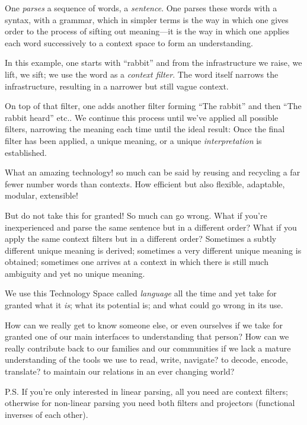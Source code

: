 \documentclass[twoside]{article}
\begin{document}
One \emph{parses} a sequence of words, a \emph{sentence}. One parses these words with a syntax, with a grammar,
which in simpler terms is the way in which one gives order to the process of sifting out meaning---it is the
way in which one applies each word successively to a context space to form an understanding.

In this example, one starts with ``rabbit'' and from the infrastructure we raise, we lift, we sift;
we use the word as a \emph{context filter}. The word itself narrows the infrastructure,
resulting in a narrower but still vague context.

On top of that filter, one adds another filter forming ``The rabbit'' and then ``The rabbit heard''
etc.. We continue this process until we've applied all possible filters, narrowing the meaning each time until
the ideal result: Once the final filter has been applied, a unique meaning, or a unique \emph{interpretation} is established.

What an amazing technology! so much can be said by reusing and recycling a far fewer number words than contexts.
How efficient but also flexible, adaptable, modular, extensible!

But do not take this for granted! So much can go wrong. What if you're inexperienced and parse the same sentence
but in a different order? What if you apply the same context filters but in a different order? Sometimes a subtly
different unique meaning is derived; sometimes a very different unique meaning is obtained; sometimes one arrives
at a context in which there is still much ambiguity and yet no unique meaning.

We use this Technology Space called \emph{language} all the time and yet take
for granted what it \emph{is}; what its potential is; and what could go wrong in its use.

How can we really get to know someone else, or even ourselves if we take for granted one of our main interfaces
to understanding that person? How can we really contribute back to our families and our communities if we lack
a mature understanding of the tools we use to read, write, navigate? to decode, encode, translate? to maintain our relations
in an ever changing world?

P.S. If you're only interested in linear parsing, all you need are context filters; otherwise for non-linear parsing you need
both filters and projectors (functional inverses of each other).
\end{document}
